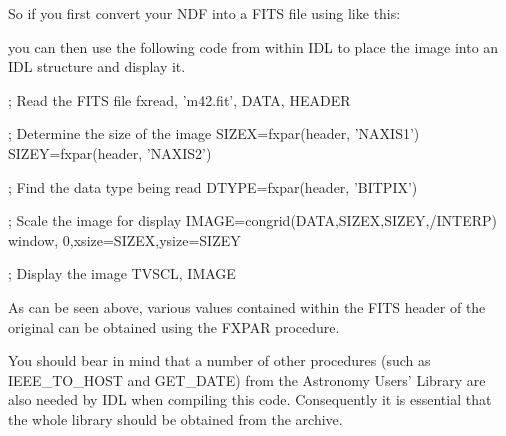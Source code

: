 \documentclass[twoside,11pt]{starlink}
\begin{document}
So if you first convert your NDF into a FITS file using
 like this:

\begin{terminalv}
\end{terminalv}
you can then use the following code from within IDL to place the image
into an IDL structure and display it.

\begin{terminalv}
; Read the FITS file
fxread, 'm42.fit', DATA, HEADER

; Determine the size of the image
SIZEX=fxpar(header, 'NAXIS1')
SIZEY=fxpar(header, 'NAXIS2')

; Find the data type being read
DTYPE=fxpar(header, 'BITPIX')

; Scale the image for display
IMAGE=congrid(DATA,SIZEX,SIZEY,/INTERP)
window, 0,xsize=SIZEX,ysize=SIZEY

; Display the image
TVSCL, IMAGE
\end{terminalv}
As can be seen above, various values contained within the FITS header
of the original can be obtained using the FXPAR procedure.

You should bear in mind that a number of other procedures (such as
IEEE\_TO\_HOST and GET\_DATE) from the Astronomy Users' Library
are also needed by IDL when compiling this code. Consequently it is
essential that the whole library should be obtained from the archive.

\newpage
\end{document}
